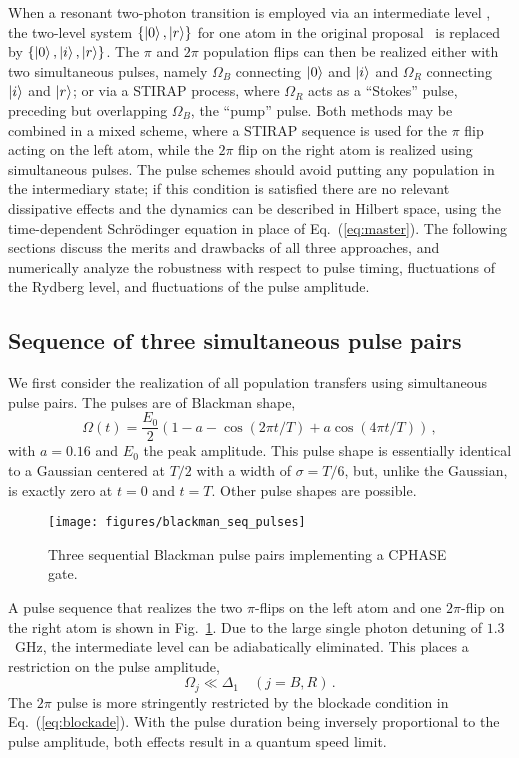 When a resonant two-photon transition is employed via an
intermediate level , the two-level system
$\{\Ket{0},\Ket{r}\}$ for one atom in the original
proposal~\cite{JakschPRL00} is
replaced by $\{\Ket{0},\Ket{i},\Ket{r}\}$. The $\pi$ and $2\pi$ population
flips can then be realized either with
two simultaneous pulses, namely $\Omega_B$ connecting
$\Ket{0}$ and $\Ket{i}$ and $\Omega_R$ connecting $\Ket{i}$
and $\Ket{r}$; or via a STIRAP process, where $\Omega_R$
acts as a ``Stokes'' pulse, preceding but overlapping $\Omega_B$, the ``pump''
pulse. Both methods may be combined in a mixed scheme, where a STIRAP sequence
is used for the $\pi$ flip acting on the left atom, while the $2\pi$ flip on the right
atom is realized using simultaneous pulses.
The pulse schemes should avoid putting any population in the intermediary state;
if this condition is satisfied there are no relevant dissipative effects and the dynamics
can be described in Hilbert space, using the time-dependent Schr\"odinger equation
in place of Eq.~(\ref{eq:master}).
The following sections discuss the merits and drawbacks of all three approaches,
and numerically analyze the robustness with respect to pulse timing,
fluctuations of the Rydberg level, and fluctuations of the pulse amplitude.

\subsection{Sequence of three simultaneous pulse pairs}
\label{subsec:RydJZ}

We first consider the realization of all population transfers using simultaneous
pulse pairs. The pulses are of Blackman shape,
\begin{equation}
  \label{eq:blackman}
  \Omega(t) = \frac{E_0}{2}\left(1 - a - \cos\left(2\pi t/T\right)
  + a\cos\left(4\pi t/T\right)\right)\,,
\end{equation}
with $a = 0.16$ and $E_0$ the peak amplitude. This pulse shape is essentially
identical to a Gaussian centered at $T/2$ with a width of $\sigma = T/6$, but,
unlike the Gaussian, is exactly zero at $t=0$ and $t=T$. Other pulse shapes are
possible.

\begin{figure}[tb]
  \begin{center}
    \texttt{[image: figures/blackman\_seq\_pulses]}
  \end{center}
  \caption{%
    Three sequential Blackman pulse pairs implementing a CPHASE gate.}
  \label{fig:jz_pulses}
\end{figure}
A pulse sequence that realizes the two $\pi$-flips on the left atom and one
$2\pi$-flip on the right atom is shown in Fig.~\ref{fig:jz_pulses}. Due to the
large single photon detuning of $1.3$~GHz, the intermediate level can be
adiabatically eliminated. This places a restriction on the pulse amplitude,
\begin{equation}
    \Omega_j \ll \Delta_1 \quad (j=B,R)\,.
\end{equation}
The $2\pi$ pulse is more stringently restricted by the blockade condition in
Eq.~(\ref{eq:blockade}). With the pulse duration being inversely proportional to
the pulse amplitude, both effects result in a quantum speed limit.

